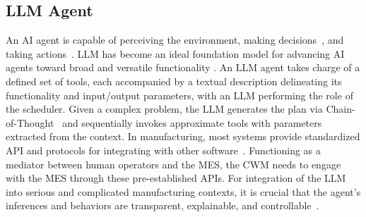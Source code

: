 \documentclass[preprint,12pt]{elsarticle}
\begin{document}


\subsection{LLM Agent}
An AI agent is capable of perceiving the environment, making decisions~\cite{wu2024processcarbonagent}, and taking actions~\cite{DBLP:conf/acl/ZengLLWLD024}. 
LLM has become an ideal foundation model for advancing AI agents toward broad and versatile functionality \cite{DBLP:conf/iclr/0036YZXLL0DMYZ024}. 
An LLM agent takes charge of a defined set of tools, each accompanied by a textual description delineating its functionality and input/output parameters, with an LLM performing the role of the scheduler. 
Given a complex problem, the LLM generates the plan via Chain-of-Thought~\cite{wei2022chain} and sequentially invokes approximate tools with parameters extracted from the context. 
In manufacturing, most systems provide standardized API and protocols for integrating with other software~\cite {SHOJAEINASAB2022503}. 
Functioning as a mediator between human operators and the MES, the CWM needs to engage with the MES through these pre-established APIs. 
For integration of the LLM into serious and complicated manufacturing contexts, it is crucial that the agent's inferences and behaviors are transparent, explainable, and controllable~\cite{delser2024counterfactual}.


\end{document}
